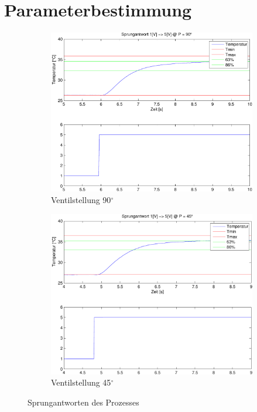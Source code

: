 \section{Parameterbestimmung}

\begin{figure}[h!]
	\centering
	\begin{subfigure}{0.475\textwidth}
		\includegraphics[width=1\textwidth]{04/step_plot_full_.pdf}
		\caption{Ventilstellung 90$^\circ$}
	\end{subfigure}
	\hfill{}
	\begin{subfigure}{0.475\textwidth}
		\includegraphics[width=1\textwidth]{04/step_plot_half_.pdf}
		\caption{Ventilstellung 45$^\circ$}
	\end{subfigure}
	\caption{Sprungantworten des Prozesses}
\end{figure}

